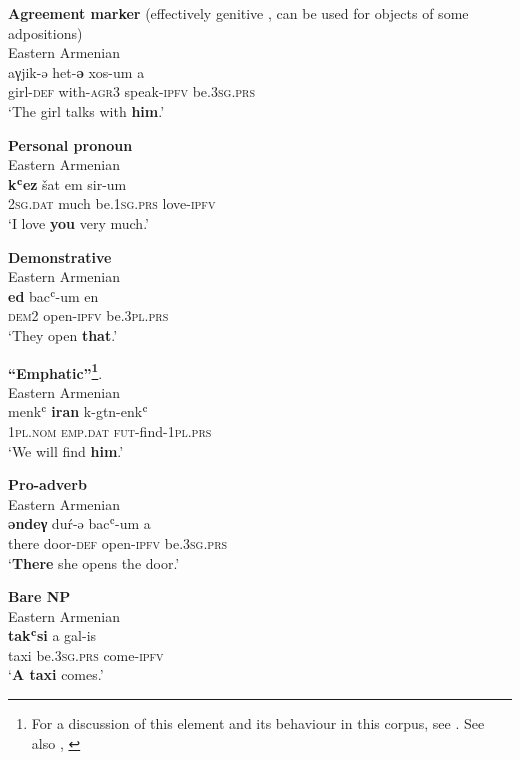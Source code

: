 \documentclass[output=paper,colorlinks,citecolor=brown,draftmode]{langscibook}
\begin{document}
\ea\label{Armenian:ex:3}
\textbf{Agreement marker} (effectively genitive , can be used for objects of some adpositions) \\
Eastern Armenian  \\
\gll aγjik-ə het-\textbf{ə} xos-um a \\
girl\textsc{-def} with\textsc{-agr3} speak\textsc{-ipfv} be\textsc{.3sg.prs} \\
\glt `The girl talks with \textbf{him}.'
\z

\ea\label{Armenian:ex:4}
\textbf{Personal pronoun} \\
Eastern Armenian  \\
\gll \textbf{kʿez} šat em sir-um \\
\textsc{2sg.dat} much be\textsc{.1sg.prs} love\textsc{-ipfv} \\
\glt `I love \textbf{you} very much.'
\z

\ea\label{Armenian:ex:5}
\textbf{Demonstrative} \\
Eastern Armenian  \\
\gll \textbf{ed} bacʿ-um en \\
\textsc{dem2} open\textsc{-ipfv} be\textsc{.3pl.prs} \\
\glt `They open \textbf{that}.'
\z

\ea\label{Armenian:ex:6}
\textbf{``Emphatic''\footnote{For a discussion of this element and its behaviour in this corpus, see \citet{hodgson_word_nodate}. See also \citet{donabedian-demopoulos_recherche_2007}, \citet{sigler_logophoric_2001}}}. \\
Eastern Armenian  \\
\gll menkʿ \textbf{iran} k-gtn-enkʿ \\
\textsc{1pl.nom} \textsc{emp.dat} \textsc{fut-}find\textsc{-1pl.prs} \\
\glt `We will find \textbf{him}.'
\z

\ea\label{Armenian:ex:7}
\textbf{Pro-adverb} \\
Eastern Armenian  \\
\gll \textbf{əndeγ} duŕ-ə bacʿ-um a \\
there door\textsc{-def} open\textsc{-ipfv} be\textsc{.3sg.prs} \\
\glt `\textbf{There} she opens the door.'
\z

\ea\label{Armenian:ex:8}
\textbf{Bare NP} \\
Eastern Armenian  \\
\gll \textbf{takʿsi} a gal-is \\
taxi be\textsc{.3sg.prs} come\textsc{-ipfv} \\
\glt `\textbf{A taxi} comes.'
\z
\end{document}

